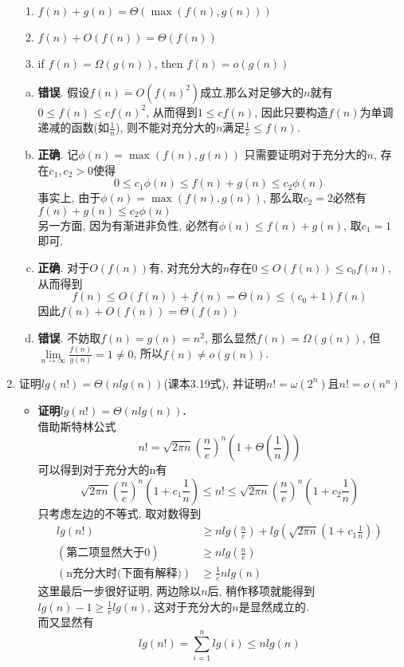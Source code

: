\documentclass[UTF8]{article}
\newcommand{\jumpLine} {\hspace*{\fill} \par}
\begin{document}
\begin{enumerate}[1.]
\begin{enumerate}[a ]
	\item $f(n)+g(n)=\Theta(\max(f(n),g(n)))$
	\item $f(n)+O(f(n))=\Theta(f(n))$
	\item if $f(n)=\Omega(g(n))$, then $f(n)=o(g(n))$
	\end{enumerate}
	\begin{enumerate}[a.]
	\item \textbf{错误}. 假设$f(n)=O(f(n)^2)$成立,那么对足够大的$n$就有$0\le f(n)\le cf(n)^2$, 从而得到$1\le cf(n)$, 因此只要构造$f(n)$为单调递减的函数(如$\frac{1}{n}$), 则不能对充分大的$n$满足$\frac{1}{c}\le f(n)$.
	\item \textbf{正确}. 记$\phi(n)=\max(f(n),g(n))$ 只需要证明对于充分大的$n$, 存在$c_1,c_2>0$使得$$0\le c_1\phi(n)\le f(n)+g(n)\le c_2\phi(n)$$
	事实上, 由于$\phi(n)=\max(f(n),g(n))$, 那么取$c_2=2$必然有$f(n)+g(n)\le c_2\phi(n)$\\
	另一方面, 因为有渐进非负性, 必然有$\phi(n)\le f(n)+g(n)$, 取$c_1=1$即可.
	\item \textbf{正确}. 对于$O(f(n))$有, 对充分大的$n$存在$0\le O(f(n))\le c_0f(n)$,
	从而得到$$f(n)\le O(f(n))+f(n)=\Theta(n)\le (c_0+1)f(n)$$
	因此$f(n)+O(f(n))=\Theta(f(n))$
	\item \textbf{错误}. 不妨取$f(n)=g(n)=n^2$, 那么显然$f(n)=\Omega(g(n))$, 但$\lim\limits_{n\rightarrow\infty}\frac{f(n)}{g(n)}=1\not=0$, 所以$f(n)\not=o(g(n))$.
	\end{enumerate}
	\jumpLine
\item 证明$lg(n!)=\Theta(nlg(n))$(课本3.19式), 并证明$n!=\omega(2^n)$且$n!=o(n^n)$
	\begin{itemize}
	\item \textbf{证明$lg(n!)=\Theta(nlg(n))$.}\\
		借助斯特林公式$$n!=\sqrt{2\pi n}(\frac{n}{e})^n(1+\Theta(\frac{1}{n}))$$
		可以得到对于充分大的n有
		$$\sqrt{2\pi n}(\frac{n}{e})^n(1+c_1\frac{1}{n})\le n!\le \sqrt{2\pi n}(\frac{n}{e})^n(1+c_2\frac{1}{n})$$
		只考虑左边的不等式, 取对数得到
		\begin{align*}
		lg(n!)&\ge nlg(\frac{n}{e})+lg(\sqrt{2\pi n}(1+c_1\frac{1}{n}))\\
		(\mbox{第二项显然大于$0$})&\ge nlg(\frac{n}{e})\\
		(\mbox{n充分大时(下面有解释)})&\ge \frac{1}{e}nlg(n)
		\end{align*}
		这里最后一步很好证明, 两边除以$n$后, 稍作移项就能得到$lg(n)-1\ge\frac{1}{e}lg(n)$, 这对于充分大的$n$是显然成立的.\\
		而又显然有
		$$lg(n!)=\sum\limits_{i=1}^nlg(i)\le nlg(n)$$

\end{itemize}
\end{enumerate}
\end{document}
